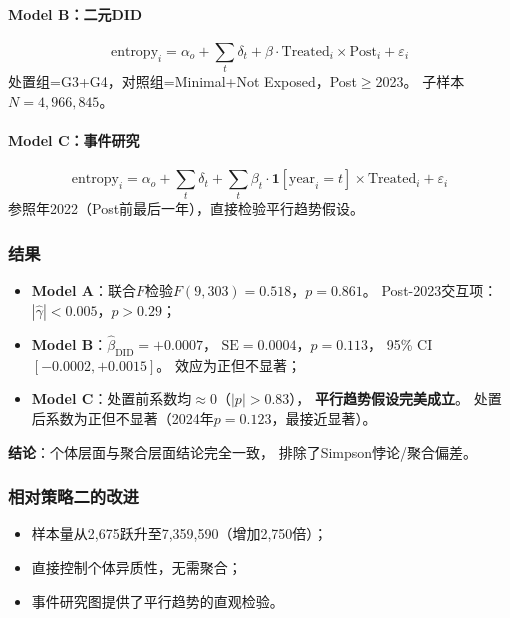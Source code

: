 \documentclass[12pt,a4paper]{ctexart}
\begin{document}
\paragraph{Model B：二元DID}
\[
\text{entropy}_i = \alpha_o + \sum_t \delta_t
+ \beta \cdot \text{Treated}_i \times \text{Post}_i + \varepsilon_i
\]
处置组=G3+G4，对照组=Minimal+Not Exposed，Post$\geq$2023。
子样本$N=4{,}966{,}845$。

\paragraph{Model C：事件研究}
\[
\text{entropy}_i = \alpha_o + \sum_t \delta_t
+ \sum_t \beta_t \cdot \mathbf{1}[\text{year}_i = t]
\times \text{Treated}_i + \varepsilon_i
\]
参照年2022（Post前最后一年），直接检验平行趋势假设。

\subsubsection{结果}

\begin{resultbox}[策略三：结果]
\begin{itemize}
\item \textbf{Model A}：联合$F$检验$F(9, 303) = 0.518$，$p = 0.861$。
      Post-2023交互项：$|\hat{\gamma}| < 0.005$，$p > 0.29$；
\item \textbf{Model B}：$\hat{\beta}_\text{DID} = +0.0007$，
      $\text{SE} = 0.0004$，$p = 0.113$，
      95\% CI $[-0.0002, +0.0015]$。
      效应为正但不显著；
\item \textbf{Model C}：处置前系数均$\approx 0$（$|p| > 0.83$），
      \textbf{平行趋势假设完美成立}。
      处置后系数为正但不显著（2024年$p=0.123$，最接近显著）。
\end{itemize}
\textbf{结论}：个体层面与聚合层面结论完全一致，
排除了Simpson悖论/聚合偏差。
\end{resultbox}

\subsubsection{相对策略二的改进}

\begin{itemize}
\item 样本量从2,675跃升至7,359,590（增加2,750倍）；
\item 直接控制个体异质性，无需聚合；
\item 事件研究图提供了平行趋势的直观检验。
\end{itemize}
\end{document}
